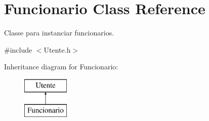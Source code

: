 \hypertarget{class_funcionario}{}\section{Funcionario Class Reference}
\label{class_funcionario}


Classe para instanciar funcionarios.  




{\ttfamily \#include $<$Utente.\+h$>$}

Inheritance diagram for Funcionario\+:\begin{figure}[H]
\begin{center}
\leavevmode
\includegraphics[height=2.000000cm]{class_funcionario}
\end{center}
\end{figure}
